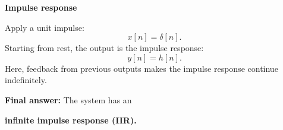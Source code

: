 \documentclass[11pt]{article}
\begin{document}
{\large\textbf{Impulse response}}\par

Apply a unit impulse:
\[
x[n]=\delta[n].
\]
Starting from rest, the output is the impulse response:
\[
y[n]=h[n].
\]
Here, feedback from previous outputs makes the impulse response continue indefinitely.

\textbf{Final answer:} The system has an\par
\textbf{infinite impulse response (IIR).}
\end{document}
